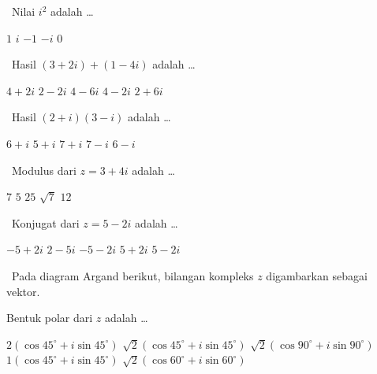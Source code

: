 \documentclass[11pt,a4paper]{exam}
\newcommand{\Fund}{{\footnotesize\textsf{\textcolor{hijau}{[Fundamental]}}}\ }
\newcommand{\Inter}{{\footnotesize\textsf{\textcolor{biru}{[Intermediate]}}}\ }
\newcommand{\Adv}{{\footnotesize\textsf{\textcolor{oranye}{[Advanced]}}}\ }
\begin{document}
\begin{questions}

\question \Fund Nilai $i^{2}$ adalah \dots
\begin{choices}
\choice $1$ \choice $i$ \CorrectChoice $-1$ \choice $-i$ \choice $0$
\end{choices}

\question \Fund Hasil $(3+2i)+(1-4i)$ adalah \dots
\begin{choices}
\choice $4+2i$ \choice $2-2i$ \choice $4-6i$ \CorrectChoice $4-2i$ \choice $2+6i$
\end{choices}

\question \Inter Hasil $(2+i)(3-i)$ adalah \dots
\begin{choices}
\choice $6+i$ \choice $5+i$ \CorrectChoice $7+i$ \choice $7-i$ \choice $6-i$
\end{choices}

\question \Inter Modulus dari $z = 3+4i$ adalah \dots
\begin{choices}
\choice $7$ \CorrectChoice $5$ \choice $25$ \choice $\sqrt{7}$ \choice $12$
\end{choices}

\question \Inter Konjugat dari $z = 5-2i$ adalah \dots
\begin{choices}
\choice $-5+2i$ \choice $2-5i$ \choice $-5-2i$ \CorrectChoice $5+2i$ \choice $5-2i$
\end{choices}

\question \Adv Pada diagram Argand berikut, bilangan kompleks $z$ digambarkan
sebagai vektor.

\begin{center}
\end{center}

Bentuk polar dari $z$ adalah \dots
\begin{choices}
\choice $2(\cos 45^\circ + i\sin 45^\circ)$
\CorrectChoice $\sqrt{2}(\cos 45^\circ + i\sin 45^\circ)$
\choice $\sqrt{2}(\cos 90^\circ + i\sin 90^\circ)$
\choice $1(\cos 45^\circ + i\sin 45^\circ)$
\choice $\sqrt{2}(\cos 60^\circ + i\sin 60^\circ)$
\end{choices}


\end{questions}
\end{document}
